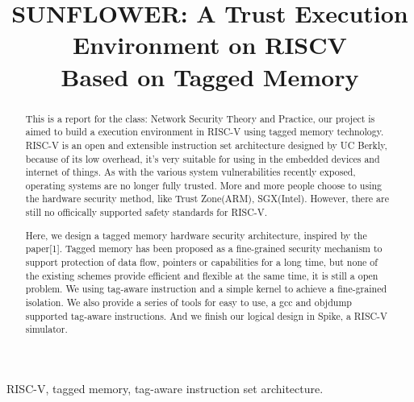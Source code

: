 \documentclass[conference]{IEEEtran}
\begin{document}
\title{\LARGE SUNFLOWER: A Trust Execution Environment on RISCV \\Based on Tagged Memory}
\author{ }

\maketitle
\setlength{\parskip}{0.4\baselineskip}


\begin{abstract}
This is a report for the class: Network Security Theory and Practice, our project is aimed to build a execution environment in RISC-V using tagged memory technology. RISC-V is an open and extensible instruction set architecture designed by UC Berkly, because of its low overhead, it's very suitable for using in the embedded devices and internet of things. As with the various system vulnerabilities recently exposed, operating systems are no longer fully trusted. More and more people choose to using the hardware security method, like Trust Zone(ARM), SGX(Intel). However, there are still no officically supported safety standards for RISC-V.

Here, we design a tagged memory hardware security architecture, inspired by the paper[1]. Tagged memory has been proposed as a fine-grained security mechanism to support protection of data flow, pointers or capabilities for a long time, but none of the existing schemes provide efficient and flexible at the same time, it is still a open problem. We using tag-aware instruction and a simple kernel to achieve a fine-grained isolation. We also provide a series of tools for easy to use, a gcc and objdump supported tag-aware instructions. And we finish our logical design in Spike, a RISC-V simulator.
\end{abstract}

\begin{keywords}
RISC-V, tagged memory, tag-aware instruction set architecture.\\
\end{keywords}


\end{document}
